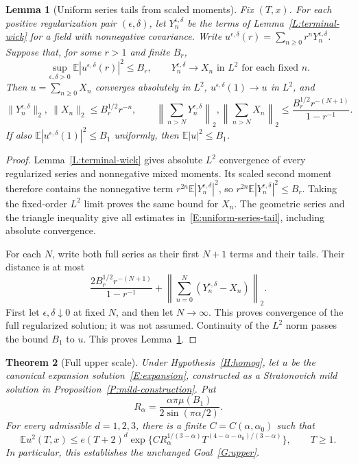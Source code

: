 \documentclass[12pt]{article}
\numberwithin{equation}{section}
\newtheorem{theorem}{Theorem}[section]
\newtheorem{lemma}[theorem]{Lemma}
\theoremstyle{definition}
\newcommand{\E}{\mathbb{E}}
\begin{document}
\begin{lemma}[Uniform series tails from scaled moments]\label{L:uniform-series-tail}
  Fix $(T,x)$. For each positive regularization pair $(\epsilon,\delta)$,
  let $Y_n^{\epsilon,\delta}$ be the terms of
  Lemma~\ref{L:terminal-wick} for a field with nonnegative covariance.
  Write $u^{\epsilon,\delta}(r)=\sum_{n\ge0}r^nY_n^{\epsilon,\delta}$.
  Suppose that, for some $r>1$ and finite $B_r$,
  \[
    \sup_{\epsilon,\delta>0}
    \E|u^{\epsilon,\delta}(r)|^2\le B_r,
    \qquad
    Y_n^{\epsilon,\delta}\longrightarrow X_n
    \text{ in }L^2\text{ for each fixed }n.
  \]
  Then $u=\sum_{n\ge0}X_n$ converges absolutely in $L^2$,
  $u^{\epsilon,\delta}(1)\to u$ in $L^2$, and
  \begin{equation}\label{E:uniform-series-tail}
    \|Y_n^{\epsilon,\delta}\|_2,\ \|X_n\|_2
    \le B_r^{1/2}r^{-n},\qquad
    \left\|\sum_{n>N}Y_n^{\epsilon,\delta}\right\|_2,
    \left\|\sum_{n>N}X_n\right\|_2
    \le\frac{B_r^{1/2}r^{-(N+1)}}{1-r^{-1}}.
  \end{equation}
  If also $\E|u^{\epsilon,\delta}(1)|^2\le B_1$ uniformly, then
  $\E|u|^2\le B_1$.
\end{lemma}

\begin{proof}
  Lemma~\ref{L:terminal-wick} gives absolute $L^2$ convergence of every
  regularized series and nonnegative mixed moments.
  Its scaled second moment therefore contains the nonnegative term
  $r^{2n}\E|Y_n^{\epsilon,\delta}|^2$, so
  $r^{2n}\E|Y_n^{\epsilon,\delta}|^2\le B_r$.
  Taking the fixed-order $L^2$ limit proves the same bound for $X_n$.
  The geometric series and the triangle inequality give all estimates
  in~\eqref{E:uniform-series-tail}, including absolute convergence.

  For each $N$, write both full series as their first $N+1$ terms
  and their tails. Their distance is at most
  \[
    \frac{2B_r^{1/2}r^{-(N+1)}}{1-r^{-1}}
    +\left\|\sum_{n=0}^N(Y_n^{\epsilon,\delta}-X_n)\right\|_2.
  \]
  First let $\epsilon,\delta\downarrow0$ at fixed $N$, and then let
  $N\to\infty$. This proves convergence of the full regularized solution;
  it was not assumed. Continuity of the $L^2$ norm passes the bound
  $B_1$ to $u$. This proves Lemma~\ref{L:uniform-series-tail}.
\end{proof}

\begin{theorem}[Full upper scale]\label{T:full-upper}
  Under Hypothesis~\ref{H:homog}, let $u$ be the canonical expansion
  solution~\eqref{E:expansion}, constructed as a Stratonovich mild
  solution in Proposition~\ref{P:mild-construction}. Put
  \[
    R_\alpha=\frac{\alpha\pi\mu(B_1)}{2\sin(\pi\alpha/2)}.
  \]
  For every admissible $d=1,2,3$, there is a finite
  $C=C(\alpha,\alpha_0)$ such that
  \begin{equation}\label{E:full-upper-bound}
    \E u^2(T,x)
    \le e(T+2)^d
    \exp\{C R_\alpha^{1/(3-\alpha)}
    T^{(4-\alpha-\alpha_0)/(3-\alpha)}\},\qquad T\ge1.
  \end{equation}
  In particular, this establishes the unchanged Goal~\ref{G:upper}.
\end{theorem}
\end{document}

